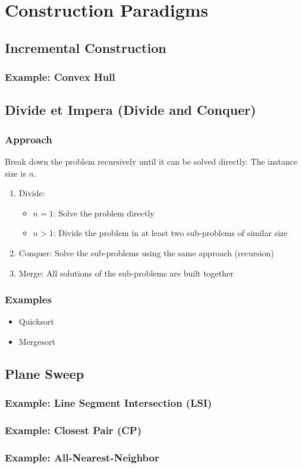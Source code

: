 \section{Construction Paradigms}
\subsection{Incremental Construction}
  \subsubsection{Example: Convex Hull}

\subsection{Divide et Impera (Divide and Conquer)}
  \subsubsection{Approach}
    Break down the problem recursively until it can be solved directly. The instance size is $n$.
    
    \begin{enumerate}
      \item Divide: 
        \begin{itemize}
          \item $n = 1$: Solve the problem directly
          \item $n > 1$: Divide the problem in at least two sub-problems of similar size
        \end{itemize}
      \item Conquer: Solve the sub-problems using the same approach (recursion)
      \item Merge: All solutions of the sub-problems are built together
    \end{enumerate}
    
   \subsubsection{Examples}
     \begin{itemize}
       \item Quicksort
       \item Mergesort
     \end{itemize}


\subsection{Plane Sweep}

  \subsubsection{Example: Line Segment Intersection (LSI)}
  \subsubsection{Example: Closest Pair (CP)}
  
  \subsubsection{Example: All-Nearest-Neighbor}
  
  

